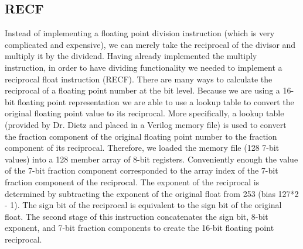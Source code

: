 \documentclass[conference]{IEEEtran}
\begin{document}
    \subsection{RECF}
    Instead of implementing a floating point division instruction (which is very complicated and expensive), we can merely take the reciprocal of the divisor and multiply it by the dividend. Having already implemented the multiply instruction, in order to have dividing functionality we needed to implement a reciprocal float instruction (RECF). There are many ways to calculate the reciprocal of a floating point number at the bit level. Because we are using a 16-bit floating point representation we are able to use a lookup table to convert the original floating point value to its reciprocal. More specifically, a lookup table (provided by Dr. Dietz and placed in a Verilog memory file) is used to convert the fraction component of the original floating point number to the fraction component of its reciprocal. Therefore, we loaded the memory file (128 7-bit values) into a 128 member array of 8-bit registers. Conveniently enough the value of the 7-bit fraction component corresponded to the array index of the 7-bit fraction component of the reciprocal. The exponent of the reciprocal is determined by subtracting the exponent of the original float from 253 (bias 127*2 - 1). The sign bit of the reciprocal is equivalent to the sign bit of the original float. The second stage of this instruction concatenates the sign bit, 8-bit exponent, and 7-bit fraction components to create the 16-bit floating point reciprocal.
    
\end{document}
